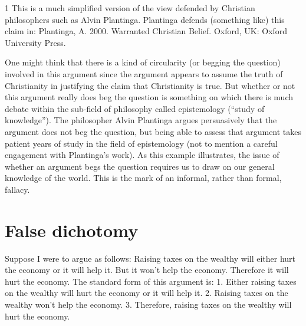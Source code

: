 1 This is a much simplified version of the view defended by Christian philosophers such as Alvin
Plantinga. Plantinga defends (something like) this claim in: Plantinga, A. 2000. Warranted
Christian Belief. Oxford, UK: Oxford University Press.

One might think that there is a kind of circularity (or begging the question)
involved in this argument since the argument appears to assume the truth of
Christianity in justifying the claim that Christianity is true. But whether or not this
argument really does beg the question is something on which there is much
debate within the sub-field of philosophy called epistemology (``study of
knowledge''). The philosopher Alvin Plantinga argues persuasively that the
argument does not beg the question, but being able to assess that argument
takes patient years of study in the field of epistemology (not to mention a careful
engagement with Plantinga's work). As this example illustrates, the issue of
whether an argument begs the question requires us to draw on our general
knowledge of the world. This is the mark of an informal, rather than formal,
fallacy.

\section{False dichotomy}

Suppose I were to argue as follows:
Raising taxes on the wealthy will either hurt the economy or it will help it.
But it won't help the economy. Therefore it will hurt the economy.
The standard form of this argument is:
1. Either raising taxes on the wealthy will hurt the economy or it will help
it.
2. Raising taxes on the wealthy won't help the economy.
3. Therefore, raising taxes on the wealthy will hurt the economy.

